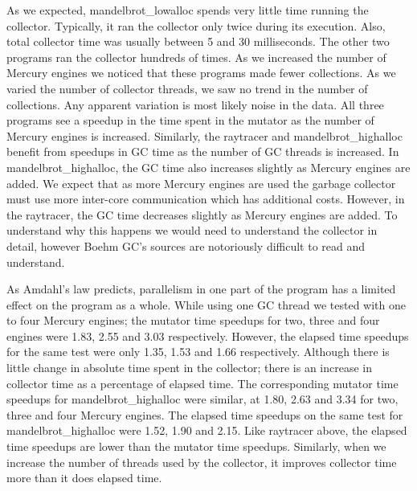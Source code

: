 As we expected, mandelbrot\_lowalloc spends very little time running the collector.
Typically, it ran the collector only twice during its execution.
Also, total collector time was usually between 5 and 30 milliseconds.
The other two programs ran the collector hundreds of times.
As we increased the number of Mercury engines
we noticed that these programs made fewer collections.
As we varied the number of collector threads,
we saw no trend in the number of collections.
Any apparent variation is most likely noise in the data.
All three programs see a speedup in the time spent in the mutator as the
number of Mercury engines is increased.
Similarly,
the raytracer and mandelbrot\_highalloc benefit from speedups
in GC time as the number of GC threads is increased.
In mandelbrot\_highalloc,
the GC time also increases slightly as Mercury engines are added.
We expect that as more Mercury engines are used the garbage collector
must use more inter-core communication which has additional costs.
However, in the raytracer,
the GC time decreases slightly as Mercury engines are added.
To understand why this happens we would need to understand the collector in
detail,
however Boehm GC's sources are notoriously difficult to read and
understand.

As Amdahl's law predicts,
parallelism in one part of the program has a limited effect on the program
as a whole.
While using one GC thread
we tested with one to four Mercury engines;
the mutator time speedups for two, three and four engines were
1.83, 2.55 and 3.03 respectively.
However, the elapsed time speedups for the same test were only
1.35, 1.53 and 1.66 respectively.
Although there is little change in absolute time spent in the collector;
there is an increase in collector time as a percentage of elapsed time.
The corresponding mutator time speedups for mandelbrot\_highalloc were
similar,
at 1.80, 2.63 and 3.34 for two, three and four Mercury engines.
The elapsed time speedups on the same test for mandelbrot\_highalloc were
1.52, 1.90 and 2.15.
Like raytracer above, the elapsed time speedups are lower than the mutator
time speedups.
Similarly,
when we increase the number of threads used by the collector,
it improves collector time more than it does elapsed time.

